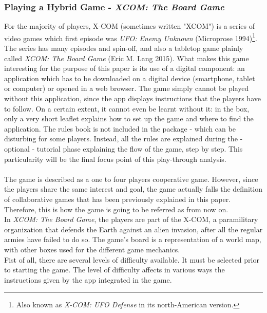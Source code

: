 \subsubsection{Playing a Hybrid Game - \textit{XCOM: The Board Game}}
For the majority of players, X-COM (sometimes written "XCOM") is a series of video games which first episode was \textit{UFO: Enemy Unknown} (Microprose 1994)\footnote{Also known as \textit{X-COM: UFO Defense} in its north-American version.}. The series has many episodes and spin-off, and also a tabletop game plainly called \textit{XCOM: The Board Game} (Eric M. Lang 2015). What makes this game interesting for the purpose of this paper is its use of a digital component: an application which has to be downloaded on a digital device (smartphone, tablet or computer) or opened in a web browser. The game simply cannot be played without this application, since the app displays instructions that the players have to follow. On a certain extent, it cannot even be learnt without it: in the box, only a very short leaflet explains how to set up the game and where to find the application. The rules book is not included in the package - which can be disturbing for some players. Instead, all the rules are explained during the - optional - tutorial phase explaining the flow of the game, step by step. This particularity will be the final focus point of this play-through analysis.
\\\\
The game is described as a one to four players cooperative game. However, since the players share the same interest and goal, the game actually falls the definition of collaborative games that has been previously explained in this paper. Therefore, this is how the game is going to be referred as from now on.\\
In \textit{XCOM: The Board Game}, the players are part of the X-COM, a paramilitary organization that defends the Earth against an alien invasion, after all the regular armies have failed to do so. The game's board is a representation of a world map, with other boxes used for the different game mechanics.\\
Fist of all, there are several levels of difficulty available. It must be selected prior to starting the game. The level of difficulty affects in various ways the instructions given by the app integrated in the game.\\
